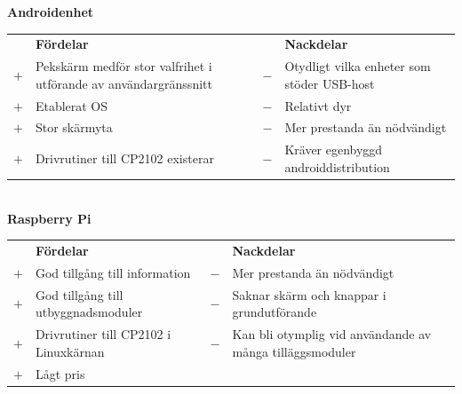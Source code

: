 \documentclass{article}
\begin{document}
            \noindent\textsf{\textbf{Androidenhet}}\\
            \begin{tabularx}{\textwidth}{@{}cXcX}
                & \textbf{Fördelar}     & & \textbf{Nackdelar} \\
                $+$ & Pekskärm medför stor valfrihet i utförande av användargränssnitt     &                            $-$ & Otydligt vilka enheter som
                                                  stöder USB-host \\
                $+$ &  Etablerat OS     &   $-$ & Relativt dyr \\
                $+$ &  Stor skärmyta    &   $-$ & Mer prestanda än nödvändigt \\
                $+$ &  Drivrutiner till CP2102 existerar &
                                            $-$ & Kräver egenbyggd androiddistribution \\
            \end{tabularx}\\

                
            \noindent\textsf{\textbf{Raspberry Pi}}\\
            \begin{tabularx}{\textwidth}{@{}cXcX}
                & \textbf{Fördelar}     & & \textbf{Nackdelar} \\
                $+$ & God tillgång till information & 
                                        $-$ & Mer prestanda än nödvändigt \\
                $+$ & God tillgång till utbyggnads\-moduler & 
                                        $-$ & Saknar skärm och knappar i 
                                              grundutförande \\
                $+$ & Drivrutiner till CP2102 i Linuxkärnan &
                                        $-$ & Kan bli otymplig vid användande av   
                                              många tilläggsmoduler \\   
                $+$ & Lågt pris \\   
            \end{tabularx}\\
            
\end{document}
